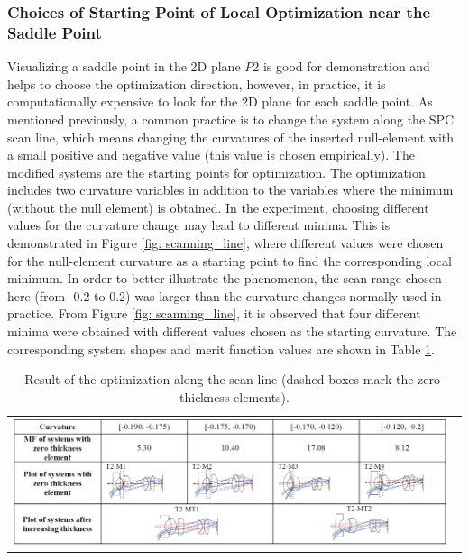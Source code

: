\subsubsection{Choices of Starting Point of Local Optimization near the Saddle Point}
Visualizing a saddle point in the 2D plane $P2$ is good for demonstration and helps to choose the optimization direction, however, in practice, it is computationally expensive to look for the 2D plane for each saddle point. As mentioned previously, a common practice is to change the system along the SPC scan line, which means changing the curvatures of the inserted null-element with a small positive and negative value (this value is chosen empirically). The modified systems are the starting points for optimization. The optimization includes two curvature variables in addition to the variables where the minimum (without the null element) is obtained. In the experiment, choosing different values for the curvature change may lead to different minima. This is demonstrated in Figure \ref{fig: scanning_line}, where different values were chosen for the null-element curvature as a starting point to find  the corresponding local minimum. In order to better illustrate the phenomenon, the scan range chosen here (from -0.2 to 0.2) was larger than the curvature changes normally used in practice. From Figure \ref{fig: scanning_line}, it is observed that four different minima were obtained with different values chosen as the starting curvature. The corresponding system shapes and merit function values are shown in Table \ref{table: scanline}. 
\begin{table}[h!]
    \centering
    \captionsetup{justification=centering}
    \caption{Result of the optimization along the scan line (dashed boxes mark the zero-thickness elements).}
    \label{table: scanline}
    \vspace{-1em}
    \hspace*{-16.5pt} %
    \begin{tabular}{l}
    \includegraphics[width=0.98\textwidth]{chapter-4/figures/Line_Opt_table.png}
    \end{tabular}
\end{table}
